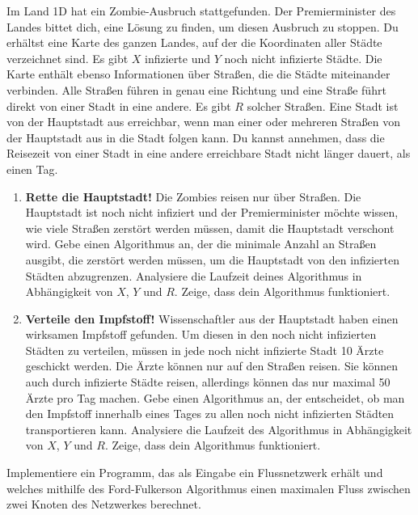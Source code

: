 \documentclass{uebung_cs}
\begin{document}
\begin{aufgabe}
    Im Land 1D hat ein Zombie-Ausbruch stattgefunden. Der Premierminister des Landes bittet dich, eine Lösung zu finden, um diesen Ausbruch zu stoppen. Du erhältst eine Karte des ganzen Landes, auf der die Koordinaten aller Städte verzeichnet sind. Es gibt $X$ infizierte und $Y$ noch nicht infizierte Städte. Die Karte enthält ebenso Informationen über Straßen, die die Städte miteinander verbinden. Alle Straßen führen in genau eine Richtung und eine Straße führt direkt von einer Stadt in eine andere. Es gibt $R$ solcher Straßen. Eine Stadt ist von der Hauptstadt aus erreichbar, wenn man einer oder mehreren Straßen von der Hauptstadt aus in die Stadt folgen kann. Du kannst annehmen, dass die Reisezeit von einer Stadt in eine andere erreichbare Stadt nicht länger dauert, als einen Tag.
    \begin{enumerate}
        \item \textbf{Rette die Hauptstadt!} Die Zombies reisen nur über Straßen. Die Hauptstadt ist noch nicht infiziert und der Premierminister möchte wissen, wie viele Straßen zerstört werden müssen, damit die Hauptstadt verschont wird. Gebe einen Algorithmus an, der die minimale Anzahl an Straßen ausgibt, die zerstört werden müssen, um die Hauptstadt von den infizierten Städten abzugrenzen. Analysiere die Laufzeit deines Algorithmus in Abhängigkeit von $X$, $Y$ und $R$. Zeige, dass dein Algorithmus funktioniert. \\
        \item \textbf{Verteile den Impfstoff!} Wissenschaftler aus der Hauptstadt haben einen wirksamen Impfstoff gefunden. Um diesen in den noch nicht infizierten Städten zu verteilen, müssen in jede noch nicht infizierte Stadt 10 Ärzte geschickt werden. Die Ärzte können nur auf den Straßen reisen. Sie können auch durch infizierte Städte reisen, allerdings können das nur maximal 50 Ärzte pro Tag machen. Gebe einen Algorithmus an, der entscheidet, ob man den Impfstoff innerhalb eines Tages zu allen noch nicht infizierten Städten transportieren kann. Analysiere die Laufzeit des Algorithmus in Abhängigkeit von $X$, $Y$ und $R$. Zeige, dass dein Algorithmus funktioniert.
    \end{enumerate}
\end{aufgabe}

\begin{aufgabe}
    Implementiere ein Programm, das als Eingabe ein Flussnetzwerk erhält und welches mithilfe des Ford-Fulkerson Algorithmus einen maximalen Fluss zwischen zwei Knoten des Netzwerkes berechnet.
\end{aufgabe}
\end{document}
